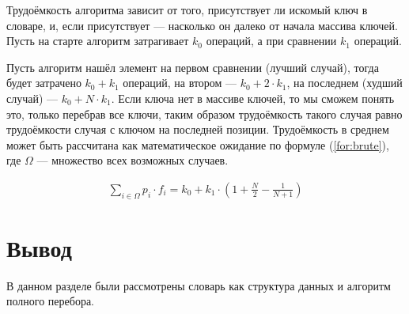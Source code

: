 Трудоёмкость алгоритма зависит от того, присутствует ли искомый ключ в словаре, и, если присутствует --- насколько он далеко от начала массива ключей.
Пусть на старте алгоритм затрагивает $k_{0}$ операций, а при сравнении $k_{1}$ операций.

Пусть алгоритм нашёл элемент на первом сравнении (лучший случай), тогда будет затрачено $k_0 + k_1$ операций, на втором --- $k_0 + 2 \cdot k_1$, на последнем (худший случай) --- $k_0 + N \cdot k_1$. Если ключа нет в массиве ключей, то мы сможем понять это, только перебрав все ключи, таким образом трудоёмкость такого случая равно трудоёмкости случая с ключом на последней позиции. Трудоёмкость в среднем может быть рассчитана как математическое ожидание по формуле (\ref{for:brute}), где $\Omega$ --- множество всех возможных случаев.

\begin{equation}
	\label{for:brute}
	\begin{aligned}
		\sum\limits_{i \in \Omega} p_i \cdot f_i = k_0 + k_1 \cdot \left(1 + \frac{N}{2} - \frac{1}{N + 1}\right)
	\end{aligned}
\end{equation}

\section{Вывод}

В данном разделе были рассмотрены словарь как структура данных и алгоритм полного перебора.

